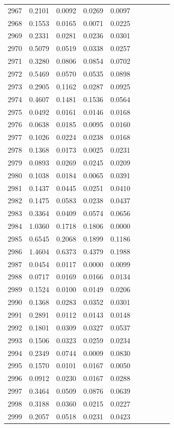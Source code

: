 \begin{table}
\begin{tabular}{cccccccccc}
2967& 0.2101& 0.0092& 0.0269& 0.0097\\ 
2968& 0.1553& 0.0165& 0.0071& 0.0225\\ 
2969& 0.2331& 0.0281& 0.0236& 0.0301\\ 
2970& 0.5079& 0.0519& 0.0338& 0.0257\\ 
2971& 0.3280& 0.0806& 0.0854& 0.0702\\ 
2972& 0.5469& 0.0570& 0.0535& 0.0898\\ 
2973& 0.2905& 0.1162& 0.0287& 0.0925\\ 
2974& 0.4607& 0.1481& 0.1536& 0.0564\\ 
2975& 0.0492& 0.0161& 0.0146& 0.0168\\ 
2976& 0.0638& 0.0185& 0.0095& 0.0160\\ 
2977& 0.1026& 0.0224& 0.0238& 0.0168\\ 
2978& 0.1368& 0.0173& 0.0025& 0.0231\\ 
2979& 0.0893& 0.0269& 0.0245& 0.0209\\ 
2980& 0.1038& 0.0184& 0.0065& 0.0391\\ 
2981& 0.1437& 0.0445& 0.0251& 0.0410\\ 
2982& 0.1475& 0.0583& 0.0238& 0.0437\\ 
2983& 0.3364& 0.0409& 0.0574& 0.0656\\ 
2984& 1.0360& 0.1718& 0.1806& 0.0000\\ 
2985& 0.6545& 0.2068& 0.1899& 0.1186\\ 
2986& 1.4604& 0.6373& 0.4379& 0.1988\\ 
2987& 0.0454& 0.0117& 0.0000& 0.0099\\ 
2988& 0.0717& 0.0169& 0.0166& 0.0134\\ 
2989& 0.1524& 0.0100& 0.0149& 0.0206\\ 
2990& 0.1368& 0.0283& 0.0352& 0.0301\\ 
2991& 0.2891& 0.0112& 0.0143& 0.0148\\ 
2992& 0.1801& 0.0309& 0.0327& 0.0537\\ 
2993& 0.1506& 0.0323& 0.0259& 0.0234\\ 
2994& 0.2349& 0.0744& 0.0009& 0.0830\\ 
2995& 0.1570& 0.0101& 0.0167& 0.0050\\ 
2996& 0.0912& 0.0230& 0.0167& 0.0288\\ 
2997& 0.3464& 0.0509& 0.0876& 0.0639\\ 
2998& 0.3188& 0.0360& 0.0215& 0.0227\\ 
2999& 0.2057& 0.0518& 0.0231& 0.0423\\ 

\end{tabular}
\end{table}
